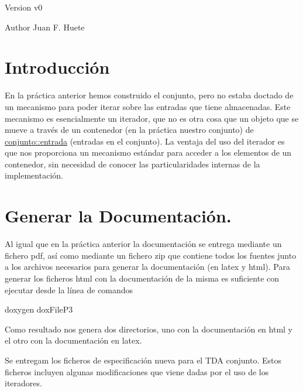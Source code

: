 \begin{DoxyVersion}{Version}
v0 
\end{DoxyVersion}
\begin{DoxyAuthor}{Author}
Juan F. Huete
\end{DoxyAuthor}
\hypertarget{index_intro_sec}{}\section{Introducción}\label{index_intro_sec}
En la práctica anterior hemos construido el conjunto, pero no estaba doctado de un mecanismo para poder iterar sobre las entradas que tiene almacenadas. Este mecanismo es esencialmente un iterador, que no es otra cosa que un objeto que se mueve a través de un contenedor (en la práctica nuestro conjunto) de \hyperlink{classconjunto_a09cad766dd65de73e51eae21f9d22585}{conjunto\+::entrada} (entradas en el conjunto). La ventaja del uso del iterador es que nos proporciona un mecanismo estándar para acceder a los elementos de un contenedor, sin necesidad de conocer las particularidades internas de la implementación.\hypertarget{index_doc}{}\section{Generar la Documentación.}\label{index_doc}
Al igual que en la práctica anterior la documentación se entrega mediante un fichero pdf, así como mediante un fichero zip que contiene todos los fuentes junto a los archivos necesarios para generar la documentación (en latex y html). Para generar los ficheros html con la documentación de la misma es suficiente con ejecutar desde la línea de comandos


\begin{DoxyCode}
doxygen doxFileP3
\end{DoxyCode}


Como resultado nos genera dos directorios, uno con la documentación en html y el otro con la documentación en latex.

Se entregam los ficheros de especificación nueva para el T\+D\+A conjunto. Estos ficheros incluyen algunas modificaciones que viene dadas por el uso de los iteradores.

